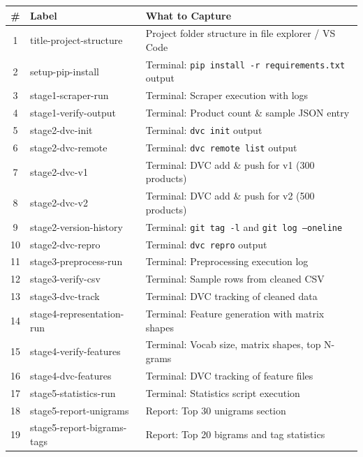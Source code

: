 \documentclass[12pt,a4paper]{article}
\begin{document}
\begin{table}[H]
\centering
\small
\begin{tabular}{@{}clp{7cm}@{}}
\toprule
\textbf{\#} & \textbf{Label} & \textbf{What to Capture} \\ \midrule
1  & title-project-structure       & Project folder structure in file explorer / VS Code \\
2  & setup-pip-install             & Terminal: \texttt{pip install -r requirements.txt} output \\
3  & stage1-scraper-run            & Terminal: Scraper execution with logs \\
4  & stage1-verify-output          & Terminal: Product count \& sample JSON entry \\
5  & stage2-dvc-init               & Terminal: \texttt{dvc init} output \\
6  & stage2-dvc-remote             & Terminal: \texttt{dvc remote list} output \\
7  & stage2-dvc-v1                 & Terminal: DVC add \& push for v1 (300 products) \\
8  & stage2-dvc-v2                 & Terminal: DVC add \& push for v2 (500 products) \\
9  & stage2-version-history        & Terminal: \texttt{git tag -l} and \texttt{git log --oneline} \\
10 & stage2-dvc-repro              & Terminal: \texttt{dvc repro} output \\
11 & stage3-preprocess-run         & Terminal: Preprocessing execution log \\
12 & stage3-verify-csv             & Terminal: Sample rows from cleaned CSV \\
13 & stage3-dvc-track              & Terminal: DVC tracking of cleaned data \\
14 & stage4-representation-run     & Terminal: Feature generation with matrix shapes \\
15 & stage4-verify-features        & Terminal: Vocab size, matrix shapes, top N-grams \\
16 & stage4-dvc-features           & Terminal: DVC tracking of feature files \\
17 & stage5-statistics-run         & Terminal: Statistics script execution \\
18 & stage5-report-unigrams        & Report: Top 30 unigrams section \\
19 & stage5-report-bigrams-tags    & Report: Top 20 bigrams and tag statistics \\

\end{tabular}
\end{table}
\end{document}
